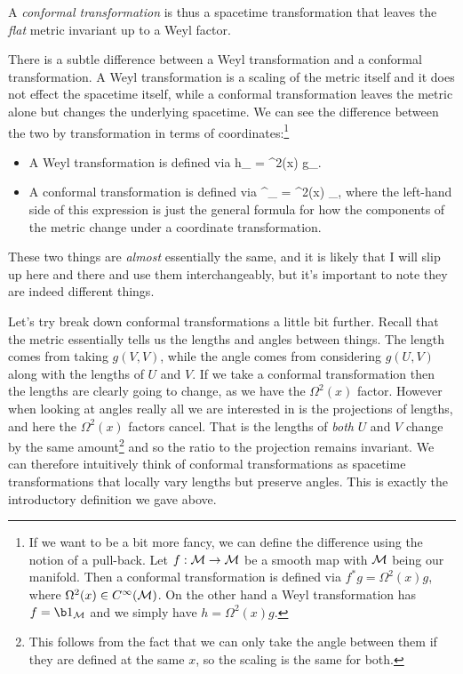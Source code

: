 \bd 
    A \textit{conformal transformation} is thus a spacetime transformation that leaves the \textit{flat} metric invariant up to a Weyl factor.
\ed 

\badr 
    There is a subtle difference between a Weyl transformation and a conformal transformation. A Weyl transformation is a scaling of the metric itself and it does not effect the spacetime itself, while a conformal transformation leaves the metric alone but changes the underlying spacetime. We can see the difference between the two by transformation in terms of coordinates:\footnote{If we want to be a bit more fancy, we can define the difference using the notion of a pull-back. Let $f:\mathcal{M}\to\mathcal{M}$ be a smooth map with $\mathcal{M}$ being our manifold. Then a conformal transformation is defined via $f^* g = \Omega^2(x) g$, where $\Omega^2(x) \in C^{\infty}(\mathcal{M})$. On the other hand a Weyl transformation has $f=\b1_{\cM}$ and we simply have $h = \Omega^2(x)g$.} 
    \begin{itemize}
        \item A Weyl transformation is defined via 
        \bse 
            h_{\mu\nu} = \Omega^2(x) g_{\mu\nu}.
        \ese
        \item A conformal transformation is defined via 
        \bse
              \eta^{\prime}_{\a\beta} = \Omega^2(x) \eta_{\mu\nu}, 
        \ese 
        where the left-hand side of this expression is just the general formula for how the components of the metric change under a coordinate transformation.
    \end{itemize}
    These two things are \textit{almost} essentially the same, and it is likely that I will slip up here and there and use them interchangeably, but it's important to note they are indeed different things. 
\eadr 

Let's try break down conformal transformations a little bit further. Recall that the metric essentially tells us the lengths and angles between things. The length comes from taking $g(V,V)$, while the angle comes from considering $g(U,V)$ along with the lengths of $U$ and $V$. If we take a conformal transformation then the lengths are clearly going to change, as we have the $\Omega^2(x)$ factor. However when looking at angles really all we are interested in is the projections of lengths, and here the $\Omega^2(x)$ factors cancel. That is the lengths of \textit{both} $U$ and $V$ change by the same amount\footnote{This follows from the fact that we can only take the angle between them if they are defined at the same $x$, so the scaling is the same for both.} and so the ratio to the projection remains invariant. We can therefore intuitively think of conformal transformations as spacetime transformations that locally vary lengths but preserve angles. This is exactly the introductory definition we gave above. 

